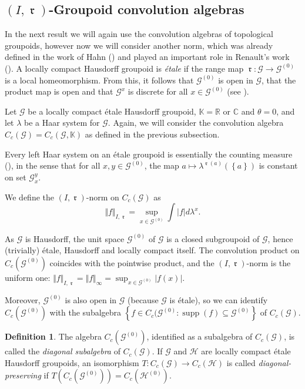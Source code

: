 \documentclass[letter,11pt]{amsart}
\theoremstyle{plain}		\newtheorem{theorem}[generalnumbering]{Theorem}
\theoremstyle{plain}		\newtheorem{corollary}[generalnumbering]{Corollary}
\theoremstyle{definition}		\newtheorem{definition}[generalnumbering]{Definition}
\theoremstyle{definition}		\newtheorem{example}[generalnumbering]{Example}
\theoremstyle{plain}		\newtheorem{proposition}[generalnumbering]{Proposition}
\theoremstyle{plain}		\newtheorem{lemma}[generalnumbering]{Lemma}
\theoremstyle{plain}    \newtheorem{plainstyle}[generalnumbering]{\namefordifferentenvironment}
\theoremstyle{plain}    \newtheorem*{plainstyle*}{\namefordifferentenvironment}
\theoremstyle{definition}    \newtheorem{definitionstyle}[generalnumbering]{\namefordifferentenvironment}
\theoremstyle{definition}    \newtheorem*{definitionstyle*}{\namefordifferentenvironment}
\DeclareMathOperator{\supp}{supp}
\DeclareMathOperator{\ra}{\mathfrak{r}}
\begin{document}
\subsection{\texorpdfstring{$(I,\ra)$}{(I,r)}-Groupoid convolution algebras}

In the next result we will again use the convolution algebras of topological groupoids, however now we will consider another norm, which was already defined in the work of Hahn (\cite{MR496797}) and played an important role in Renault's work (\cite{MR584266}). A locally compact Hausdorff groupoid is \emph{étale} if the range map $\ra\colon\mathcal{G}\to\mathcal{G}^{(0)}$ is a local homeomorphism. From this, it follows that $\mathcal{G}^{(0)}$ is open in $\mathcal{G}$, that the product map is open and that $\mathcal{G}^x$ is discrete for all $x\in\mathcal{G}^{(0)}$ (see \cite{MR2304314}).

Let $\mathcal{G}$ be a locally compact étale Hausdorff groupoid, $\mathbb{K}=\mathbb{R}$ or $\mathbb{C}$ and $\theta=0$, and let $\lambda$ be a Haar system for $\mathcal{G}$. Again, we will consider the convolution algebra $C_c(\mathcal{G})=C_c(\mathcal{G},\mathbb{K})$ as defined in the previous subsection.

Every left Haar system on an étale groupoid is essentially the counting measure (\cite[2.7]{MR584266}), in the sense that for all $x,y\in\mathcal{G}^{(0)}$, the map $a\mapsto \lambda^{\ra(a)}(\left\{a\right\})$ is constant on set $\mathcal{G}_x^y$.

We define the $(I,\ra)$-norm on $C_c(\mathcal{G})$ as
\[\Vert f\Vert_{I,\ra}=\sup_{x\in\mathcal{G}^{(0)}}\int |f|d\lambda^x.\]

As $\mathcal{G}$ is Hausdorff, the unit space $\mathcal{G}^{(0)}$ of $\mathcal{G}$ is a closed subgroupoid of $\mathcal{G}$, hence (trivially) étale, Hausdorff and locally compact itself. The convolution product on $C_c(\mathcal{G}^{(0)})$ coincides with the pointwise product, and the $(I,\ra)$-norm is the uniform one: $\Vert f\Vert_{I,\ra}=\Vert f\Vert_\infty=\sup_{x\in\mathcal{G}^{(0)}}|f(x)|$.

Moreover, $\mathcal{G}^{(0)}$ is also open in $\mathcal{G}$ (because $\mathcal{G}$ is étale), so we can identify $C_c(\mathcal{G}^{(0)})$ with the subalgebra $\left\{f\in C_c(\mathcal{G}^{(0)}:\supp(f)\subseteq\mathcal{G}^{(0)}\right\}$ of $C_c(\mathcal{G})$.

\begin{definition}
	The algebra $C_c(\mathcal{G}^{(0)})$, identified as a subalgebra of $C_c(\mathcal{G})$, is called the \emph{diagonal subalgebra} of $C_c(\mathcal{G})$. If $\mathcal{G}$ and $\mathcal{H}$ are locally compact étale Hausdorff groupoids, an isomorphism $T\colon C_c(\mathcal{G})\to C_c(\mathcal{H})$ is called \emph{diagonal-preserving} if $T(C_c(\mathcal{G}^{(0)}))=C_c(\mathcal{H}^{(0)})$.
\end{definition}
\end{document}
